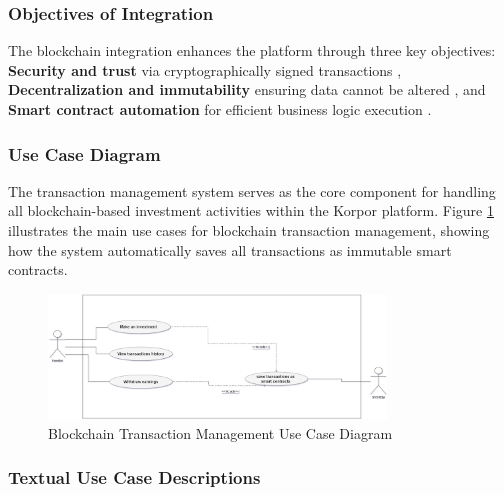 \subsubsection{Objectives of Integration}

The blockchain integration enhances the platform through three key objectives: \textbf{Security and trust} via cryptographically signed transactions \cite{Zheng2018BlockchainChallenges}, \textbf{Decentralization and immutability} ensuring data cannot be altered \cite{Antonopoulos2018MasteringEthereum}, and \textbf{Smart contract automation} for efficient business logic execution \cite{Bartoletti2017EmpiricalAnalysis, ZhangBlockchainPropertyRights2023}.

\subsubsection{Use Case Diagram}

The transaction management  system serves as the core component for handling all blockchain-based investment activities within the Korpor platform. Figure \ref{fig:transaction-use-case} illustrates the main use cases for blockchain transaction management, showing how the system automatically saves all transactions as immutable smart contracts.

\begin{figure}[htbp]
    \centering
    \includegraphics[width=0.8\textwidth]{images/transaction_use_case_diagram.png}
    \caption{Blockchain Transaction Management Use Case Diagram}
    \label{fig:transaction-use-case}
\end{figure}
\subsubsection{Textual Use Case Descriptions}

